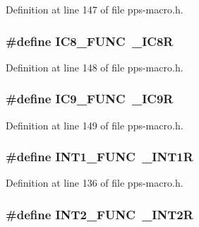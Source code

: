 Definition at line 147 of file pps-\/macro.\+h.

\hypertarget{pps-macro_8h_a17bc23098824aeee2d72adea041f0cba}{}
\subsubsection[{I\+C8\+\_\+\+F\+U\+N\+C}]{\setlength{\rightskip}{0pt plus 5cm}\#define I\+C8\+\_\+\+F\+U\+N\+C~\+\_\+\+I\+C8\+R}\label{pps-macro_8h_a17bc23098824aeee2d72adea041f0cba}


Definition at line 148 of file pps-\/macro.\+h.

\hypertarget{pps-macro_8h_a6a201842d0e759324a15a51e34cdab88}{}
\subsubsection[{I\+C9\+\_\+\+F\+U\+N\+C}]{\setlength{\rightskip}{0pt plus 5cm}\#define I\+C9\+\_\+\+F\+U\+N\+C~\+\_\+\+I\+C9\+R}\label{pps-macro_8h_a6a201842d0e759324a15a51e34cdab88}


Definition at line 149 of file pps-\/macro.\+h.

\hypertarget{pps-macro_8h_a111e7cf170648c90459233189fb55d41}{}
\subsubsection[{I\+N\+T1\+\_\+\+F\+U\+N\+C}]{\setlength{\rightskip}{0pt plus 5cm}\#define I\+N\+T1\+\_\+\+F\+U\+N\+C~\+\_\+\+I\+N\+T1\+R}\label{pps-macro_8h_a111e7cf170648c90459233189fb55d41}


Definition at line 136 of file pps-\/macro.\+h.

\hypertarget{pps-macro_8h_a38841437206d0d323476b88edfe49352}{}
\subsubsection[{I\+N\+T2\+\_\+\+F\+U\+N\+C}]{\setlength{\rightskip}{0pt plus 5cm}\#define I\+N\+T2\+\_\+\+F\+U\+N\+C~\+\_\+\+I\+N\+T2\+R}\label{pps-macro_8h_a38841437206d0d323476b88edfe49352}


